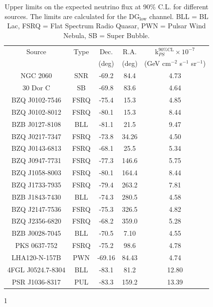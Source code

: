 \begin{table}
  \centering
  \begin{tabular}{|c|c|c|c|c|}
    \hline
    Source & Type & Dec. & R.A. & k$^{\text{90\%CL}}_{PS} \times 10^{-7}$ \\
    & & (deg) & (deg) & (GeV cm$^{-2}$ s$^{-1}$ sr$^{-1}$) \\
    \hline
    NGC 2060 & SNR & -69.2 & 84.4 & 4.73 \\
    30 Dor C & SB & -69.8 & 83.6 & 4.64 \\
    BZQ J0102-7546 & FSRQ & -75.4 & 15.3 & 4.85 \\
    BZQ J0102-8012 & FSRQ &-80.1 & 15.3 & 8.44  \\
    BZB J0127-8108 & BLL & -81.1 & 21.5 & 9.47 \\
    BZQ J0217-7347 & FSRQ &-73.8 & 34.26 & 4.50 \\
    BZQ J0143-6813 & FSRQ &-68.1 & 25.5 & 5.34 \\
    BZQ J0947-7731 & FSRQ &-77.3 & 146.6 & 5.75 \\
    BZQ J1058-8003 & FSRQ & -80.1 & 164.4 & 8.44 \\
    BZQ J1733-7935 & FSRQ &-79.4 & 263.2 & 7.81 \\
    BZB J1843-7430 & BLL& -74.3 & 280.5 & 4.58 \\
    BZQ J2147-7536 & FSRQ &-75.3 & 326.5 & 4.82 \\
    BZQ J2356-6820 & FSRQ&-68.2 & 359.0 & 5.28 \\
    BZB J0028-7045 & BLL&-70.5 & 7.10 & 4.55 \\
    PKS 0637-752 & FSRQ &-75.2 & 98.6 & 4.78 \\
    LHA120-N-157B & PWN & -69.16 & 84.43 & 4.74 \\
    4FGL J0524.7-8304 & BLL & -83.1 & 81.2 & 12.80 \\
    PSR J1036-8317 & PUL & -83.3 & 159.2 & 13.39 \\
    \hline
  \end{tabular}
  \caption{Upper limits on the expected neutrino flux at 90\% C.L. for different sources. The limits are calculated for the DG$_{\text{low}}$ channel. BLL = BL Lac, FSRQ = Flat Spectrum Radio Quasar, PWN = Pulsar Wind Nebula, SB = Super Bubble.}
  \label{tab:source_limits}
\end{table}
 
1 


